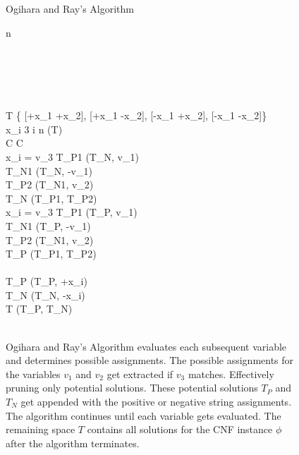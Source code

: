 
\begin{figure}[htbp]
\begin{center}

	\begin{pseudocode}{Ogihara and Ray's Algorithm}{\phi}
	
	n  \phi \\
	\\
	\\
	\\
	\\
	\\
	T \GETS \{ [+x_1 \cdot +x_2], [+x_1 \cdot -x_2], [-x_1 \cdot +x_2],  [-x_1 \cdot -x_2]\} \\
	
	\FOREACH {} x_i  3 \leq i \leq n \DO
		\BEGIN
		[T_P, T_N] \GETS {}(T)\\
	
		\FOREACH {} C  \phi \DO
			\BEGIN
				[v_1, v_2, v_3] \GETS C\\
				\IF x_i = v_3  \THEN
					\BEGIN
						T_{P1} \GETS {}(T_N, v_1)\\
						T_{N1} \GETS {}(T_N, -v_1)\\				
						T_{P2} \GETS {}(T_{N1}, v_2)\\
						T_{N} \GETS {}(T_{P1}, T_{P2})
					\END \\  
				\IF \neg x_i = v_3 \THEN
					\BEGIN
						T_{P1} \GETS {}(T_P, v_1)\\
						T_{N1} \GETS {}(T_P, -v_1)\\				
						T_{P2} \GETS {}(T_{N1}, v_2)\\
						T_{P} \GETS {}(T_{P1}, T_{P2})
					\END\\
			\END\\
			T_P \GETS {}(T_P, +x_i)\\
			T_N \GETS {}(T_N, -x_i)\\
			T \GETS {}(T_P, T_N)\\
		\END\\
	\end{pseudocode}

\caption{{\sc Ogihara and Ray's Algorithm} evaluates each subsequent variable and determines possible assignments.  The possible assignments for the variables $v_1$ and $v_2$ get extracted if $v_3$ matches.  Effectively pruning only potential solutions.  These potential solutions $T_P$ and $T_N$ get appended with the positive or negative string assignments.  The algorithm continues until each variable gets evaluated.  The remaining space $T$ contains all solutions for the CNF instance $\phi$ after the algorithm terminates.}
\label{ogiharaRayAlgorithm}
\end{center}
\end{figure}

